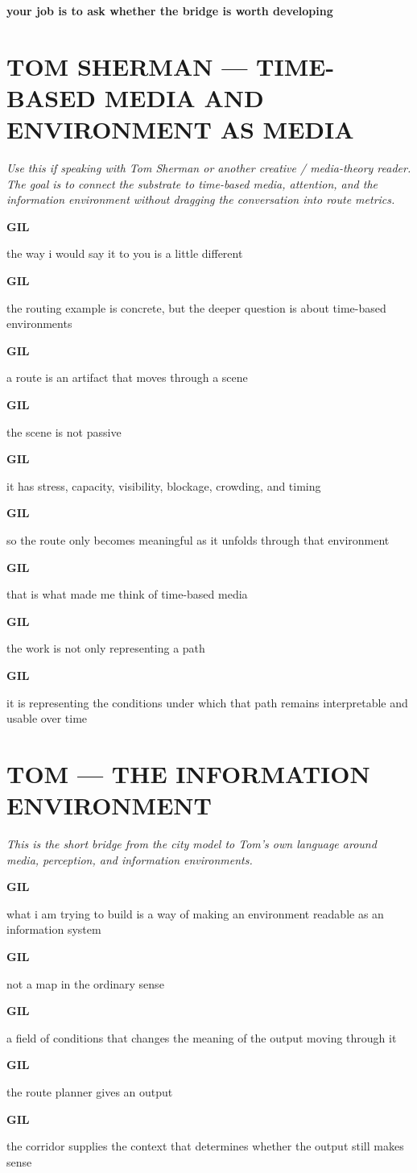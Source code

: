 \documentclass[11pt,letterpaper]{article}
\newcommand{\gil}[1]{\par\smallskip\textbf{GIL}\par #1}
\newcommand{\context}[1]{\textit{#1}\par\smallskip}
\begin{document}
\textbf{your job is to ask whether the bridge is worth developing}


\section*{TOM SHERMAN --- TIME-BASED MEDIA AND ENVIRONMENT AS MEDIA}

\context{Use this if speaking with Tom Sherman or another creative / media-theory reader. The goal is to connect the substrate to time-based media, attention, and the information environment without dragging the conversation into route metrics.}

\gil{the way i would say it to you is a little different}

\gil{the routing example is concrete, but the deeper question is about time-based environments}

\gil{a route is an artifact that moves through a scene}

\gil{the scene is not passive}

\gil{it has stress, capacity, visibility, blockage, crowding, and timing}

\gil{so the route only becomes meaningful as it unfolds through that environment}

\gil{that is what made me think of time-based media}

\gil{the work is not only representing a path}

\gil{it is representing the conditions under which that path remains interpretable and usable over time}

\section*{TOM --- THE INFORMATION ENVIRONMENT}

\context{This is the short bridge from the city model to Tom's own language around media, perception, and information environments.}

\gil{what i am trying to build is a way of making an environment readable as an information system}

\gil{not a map in the ordinary sense}

\gil{a field of conditions that changes the meaning of the output moving through it}

\gil{the route planner gives an output}

\gil{the corridor supplies the context that determines whether the output still makes sense}
\end{document}
